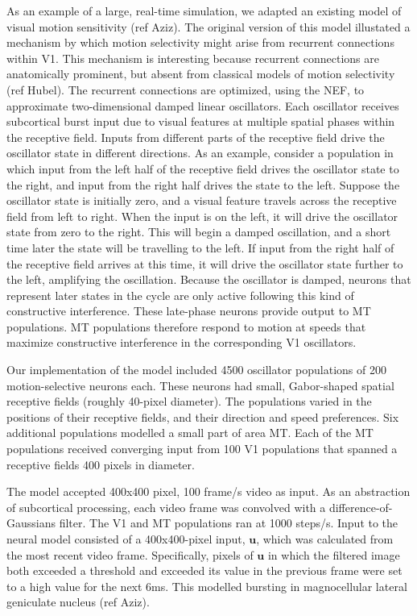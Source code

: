 \documentclass[english]{article}
\begin{document}
As an example of a large, real-time simulation, we adapted an existing model of visual motion sensitivity (ref Aziz). The original version of this model illustated a mechanism by which motion selectivity might arise from recurrent connections within V1. This mechanism is interesting because recurrent connections are anatomically prominent, but absent from classical models of motion selectivity (ref Hubel).  
The recurrent connections are optimized, using the NEF, to approximate two-dimensional damped linear oscillators. Each oscillator receives subcortical burst input due to visual features at multiple spatial phases within the receptive field. Inputs from different parts of the receptive field drive the oscillator state in different directions. 
As an example, consider a population in which input from the left half of the receptive field drives the oscillator state to the right, and input from the right half drives the state to the left. Suppose the oscillator state is initially zero, and a visual feature travels across the receptive field from left to right. When the input is on the left, it will drive the oscillator state from zero to the right. This will begin a damped oscillation, and a short time later the state will be travelling to the left. If input from the right half of the receptive field arrives at this time, it will drive the oscillator state further to the left, amplifying the oscillation. 
Because the oscillator is damped, neurons that represent later states in the cycle are only active following this kind of constructive interference. These late-phase neurons provide output to MT populations. MT populations therefore respond to motion at speeds that maximize constructive interference in the corresponding V1 oscillators.  

Our implementation of the model included 4500 oscillator populations of 200 motion-selective neurons each. These neurons had small, Gabor-shaped spatial receptive fields (roughly 40-pixel diameter). The populations varied in the positions of their receptive fields, and their direction and speed preferences. Six additional populations modelled a small part of area MT. Each of the MT populations received converging input from 100 V1 populations that spanned a receptive fields 400 pixels in diameter. 

The model accepted 400x400 pixel, 100 frame/s video as input. As an abstraction of subcortical processing, each video frame was convolved with a difference-of-Gaussians filter. The V1 and MT populations ran at 1000 steps/s. Input to the neural model consisted of a 400x400-pixel input, $\mathbf{u}$, which was calculated from the most recent video frame. Specifically, pixels of $\mathbf{u}$ in which the filtered image both exceeded a threshold and exceeded its value in the previous frame were set to a high value for the next 6ms. This modelled bursting in magnocellular lateral geniculate nucleus (ref Aziz). 
\end{document}

